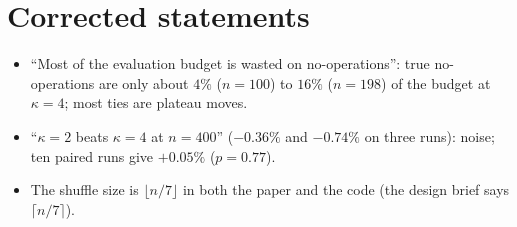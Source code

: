 \section*{Corrected statements}

\begin{itemize}
\item \enquote{Most of the evaluation budget is wasted on no-operations}: true no-operations are only about $4\%$ ($n=100$) to $16\%$ ($n=198$) of the budget at $\kappa=4$; most ties are plateau moves.
\item \enquote{$\kappa=2$ beats $\kappa=4$ at $n=400$} ($-0.36\%$ and $-0.74\%$ on three runs): noise; ten paired runs give $+0.05\%$ ($p=0.77$).
\item The shuffle size is $\lfloor n/7\rfloor$ in both the paper and the code (the design brief says $\lceil n/7\rceil$).
\end{itemize}
